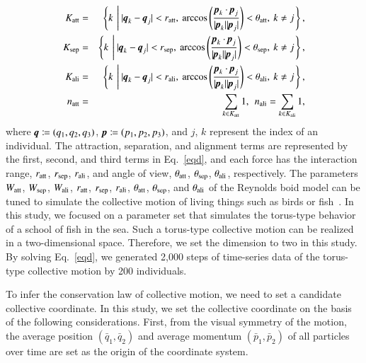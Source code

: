 \documentclass[preprint,
bibnotes,
 amsmath,amssymb,
 aps,
]{revtex4-1}
\begin{document}
\begin{eqnarray*}
K_{\rm att} &=& \left\{k \:\left|\: |{\textit{\textbf{q}}}_k - {\textit{\textbf{q}}}_j| < r_{\rm att},\: \arccos\left(\frac{{\textit{\textbf{p}}}_k \cdot {\textit{\textbf{p}}}_j}{|{\textit{\textbf{p}}}_k| |{\textit{\textbf{p}}}_j|}\right)<\theta_{\rm att},\:k \neq j\right.\right\},\\
K_{\rm sep} &=& \left\{k \:\left|\: |{\textit{\textbf{q}}}_k - {\textit{\textbf{q}}}_j| < r_{\rm sep},\: \arccos\left(\frac{{\textit{\textbf{p}}}_k \cdot {\textit{\textbf{p}}}_j}{|{\textit{\textbf{p}}}_k| |{\textit{\textbf{p}}}_j|}\right)<\theta_{\rm sep},\:k \neq j\right.\right\},\\
K_{\rm ali} &=& \left\{k \:\left|\: |{\textit{\textbf{q}}}_k - {\textit{\textbf{q}}}_j| < r_{\rm ali},\: \arccos\left(\frac{{\textit{\textbf{p}}}_k \cdot {\textit{\textbf{p}}}_j}{|{\textit{\textbf{p}}}_k| |{\textit{\textbf{p}}}_j|}\right)<\theta_{\rm ali},\:k \neq j\right.\right\},\\
n_{\rm att} &=& \sum_{k\in K_{\rm att}} 1,\:\:n_{\rm ali} = \sum_{k\in K_{\rm ali}} 1,
\end{eqnarray*}
where ${\textit{\textbf{q}}}\coloneqq(q_1,q_2,q_3)$, ${\textit{\textbf{p}}}\coloneqq(p_1,p_2,p_3)$, and $j$, $k$ represent the index of an individual. 
The attraction, separation, and alignment terms are represented by the first, second, and third terms in Eq.~\eqref{eqd}, and each force has the interaction range, $r_{\rm att}$, $r_{\rm sep}$, $r_{\rm ali}$, and angle of view, $\theta_{\rm att}$, $\theta_{\rm sep}$, $\theta_{\rm ali}$, respectively. 
The parameters $W_{\rm att}$, $W_{\rm sep}$, $W_{\rm ali}$, $r_{\rm att}$, $r_{\rm sep}$, $r_{\rm ali}$, $\theta_{\rm att}$, $\theta_{\rm sep}$, and $\theta_{\rm ali}$ of the Reynolds boid model can be tuned to simulate the collective motion of living things such as birds or fish~\cite{reynolds1987flocks, couzin2002collective}. 
In this study, we focused on a parameter set that simulates the torus-type behavior of a school of fish in the sea. Such a torus-type collective motion can be realized in a two-dimensional space. 
Therefore, we set the dimension to two in this study. 
By solving Eq.~\eqref{eqd}, we generated 2,000 steps of time-series data of the torus-type collective motion by 200 individuals.\par
To infer the conservation law of collective motion, we need to set a candidate collective coordinate. In this study, we set the collective coordinate on the basis of the following considerations. 
First, from the visual symmetry of the motion, the average position $(\bar{q}_1,\bar{q}_2)$ and average momentum $(\bar{p}_1,\bar{p}_2)$ of all particles over time are set as the origin of the coordinate system. 
\end{document}
